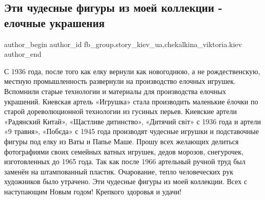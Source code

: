  
 
 
 
 
 
\subsection{Эти чудесные фигуры из моей коллекции - елочные украшения}
\label{sec:31_12_2021.fb.fb_group.story_kiev_ua.1.jolka_ukrashenia}
 
\ifcmt
 author_begin
   author_id fb_group.story_kiev_ua,chekalkina_viktoria.kiev
 author_end
\fi

С 1936 года, после того как елку вернули как новогоднюю, а не рождественскую,
местную промышленность развернули на производство елочных игрушек. Вспомнили
старые технологии и материалы для производства елочных украшений. Киевская
артель «Игрушка» стала производить маленькие ёлочки по старой дореволюционной
технологии из гусиных перьев. Киевские артели «Радянский Китай», «Щастливе
дитинство», «Дитячий світ» с 1936 года и артели «9 травня», «Побєда» с 1945
года производят чудесные игрушки и подставочные фигуры под елку из Ваты и Папье
Маше.  Прошу всех желающих делиться фотографиями своих семейных ватных игрушек,
дедов морозов, снегурочек, изготовленных до 1965 года. Так как после 1966
артельный ручной труд был заменён на штампованный пластик. Очарование, тепло
человеческих рук художников было утрачено.  Эти чудесные фигуры из моей
коллекции. Всех с наступающим Новым годом! Крепкого здоровья и удачи!

